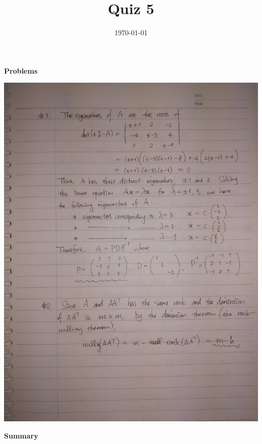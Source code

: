 \documentclass{homework}
\title{Quiz 5}
\date{\today}
\begin{document}
\maketitle
\setlength{\parindent}{0pt}
\vspace*{-0.8cm}
{\Large\bf Problems}

\includegraphics[width=\textwidth,origin=c]{prob1.jpg}
\newpage

\vspace*{-0.5cm}
{\Large\bf Summary}
\end{document}
